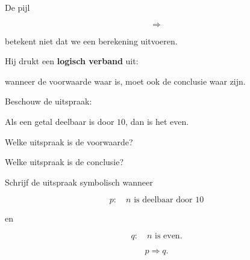 \documentclass{ximera}
\begin{document}
\begin{opmerking}

De pijl

\[
\Rightarrow
\]

betekent niet dat we een berekening uitvoeren.

Hij drukt een \textbf{logisch verband} uit:

wanneer de voorwaarde waar is, moet ook de conclusie waar zijn.

\end{opmerking}


\begin{oefening}{\oefB\ESS}

Beschouw de uitspraak:

\begin{center}
Als een getal deelbaar is door $10$, dan is het even.
\end{center}

\begin{question}

Welke uitspraak is de voorwaarde?

\begin{multipleChoice}
\end{multipleChoice}

\end{question}

\begin{question}

Welke uitspraak is de conclusie?

\begin{multipleChoice}
\end{multipleChoice}

\end{question}

\begin{question}

Schrijf de uitspraak symbolisch wanneer

\[
p:\quad n\text{ is deelbaar door }10
\]

en

\[
q:\quad n\text{ is even}.
\]

\begin{oplossing}

\[
p\Rightarrow q.
\]

\end{oplossing}

\end{question}

\end{oefening}
\end{document}
